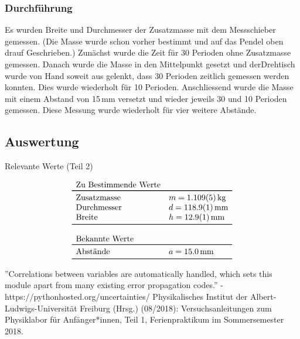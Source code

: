 \documentclass[11pt,a4paper]{article}
\begin{document}
\subsubsection{Durchführung}

Es wurden Breite und Durchmesser der Zusatzmasse mit dem Messschieber gemessen. (Die Masse wurde schon vorher bestimmt und auf das Pendel oben drauf Geschrieben.) Zunächst wurde die Zeit für 30 Perioden ohne Zusatzmasse gemessen. Danach wurde die Masse in den Mittelpunkt gesetzt und  derDrehtisch wurde von Hand soweit aus gelenkt, dass 30 Perioden zeitlich gemessen werden konnten. Dies wurde wiederholt für 10 Perioden. Anschliessend wurde die Masse mit einem Abstand von 15\,mm versetzt und wieder jeweils 30 und 10 Perioden gemessen. Diese Messung wurde wiederholt für vier weitere Abstände. 

\subsection{Auswertung}

\begin{table}[ht]
\caption{Relevante Werte (Teil 2)}
$$
\begin{array}{ll}
	\multicolumn{1}{l}{\textrm{Zu Bestimmende Werte}} \\
	\toprule 
	\textrm{Zusatzmasse} & m = 1.109(5)\,\textrm{kg} \\
	\textrm{Durchmesser} & d = 118.9(1)\,\textrm{mm} \\
	\textrm{Breite} & h = 12.9(1)\,\textrm{mm} \\
	\bottomrule \\
	\multicolumn{2}{l}{\textrm{Bekannte Werte}} \\
	\toprule
	\textrm{Abstände} & a = 15.0\,\textrm{mm}\\
	\bottomrule 
\end{array}
$$
\end{table}



\vfill

\begin{thebibliography}{9}
 ''Correlations between variables are automatically handled, which sets this module apart from many existing error propagation codes.'' - https://pythonhosted.org/uncertainties/
  Physikalisches Institut der Albert-Ludwigs-Universität Freiburg (Hrsg.) (08/2018): Versuchsanleitungen zum Physiklabor für Anfänger*innen, Teil 1, Ferienpraktikum im Sommersemester 2018.
 \end{thebibliography}
 
\end{document}
